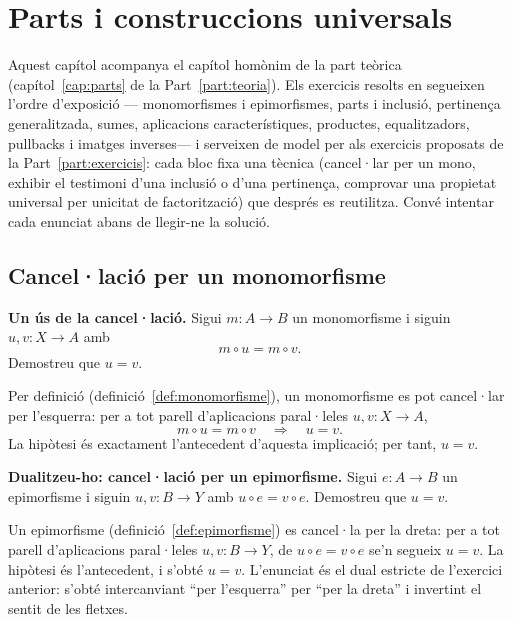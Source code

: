\chapter{Parts i construccions universals}\label{cap:practica-parts}

Aquest capítol acompanya el capítol homònim de la part teòrica (capítol~\ref{cap:parts} de la Part~\ref{part:teoria}). Els exercicis resolts en segueixen l'ordre d'exposició --- monomorfismes i epimorfismes, parts i inclusió, pertinença generalitzada, sumes, aplicacions característiques, productes, equalitzadors, pullbacks i imatges inverses--- i serveixen de model per als exercicis proposats de la Part~\ref{part:exercicis}: cada bloc fixa una tècnica (cancel·lar per un mono, exhibir el testimoni d'una inclusió o d'una pertinença, comprovar una propietat universal per unicitat de factorització) que després es reutilitza. Convé intentar cada enunciat abans de llegir-ne la solució.

\section{Cancel·lació per un monomorfisme}\label{prac:cancel-lacio}

\begin{exercici}
\textbf{Un ús de la cancel·lació.} Sigui \(m:A\to B\) un monomorfisme i siguin \(u,v:X\to A\) amb
\[
m\circ u=m\circ v.
\]
Demostreu que \(u=v\).
\end{exercici}

\begin{solucio}
Per definició (definició~\ref{def:monomorfisme}), un monomorfisme es pot cancel·lar per l'esquerra: per a tot parell d'aplicacions paral·leles \(u,v:X\to A\),
\[
m\circ u=m\circ v\quad\Longrightarrow\quad u=v.
\]
La hipòtesi és exactament l'antecedent d'aquesta implicació; per tant, \(u=v\).
\end{solucio}

\begin{exercici}
\textbf{Dualitzeu-ho: cancel·lació per un epimorfisme.} Sigui \(e:A\to B\) un epimorfisme i siguin \(u,v:B\to Y\) amb \(u\circ e=v\circ e\). Demostreu que \(u=v\).
\end{exercici}
\begin{solucio}
Un epimorfisme (definició~\ref{def:epimorfisme}) es cancel·la per la dreta: per a tot parell d'aplicacions paral·leles \(u,v:B\to Y\), de \(u\circ e=v\circ e\) se'n segueix \(u=v\). La hipòtesi és l'antecedent, i s'obté \(u=v\). L'enunciat és el dual estricte de l'exercici anterior: s'obté intercanviant \enquote{per l'esquerra} per \enquote{per la dreta} i invertint el sentit de les fletxes.
\end{solucio}

